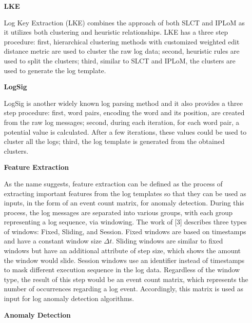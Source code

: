 \documentclass[12pt,a4paper]{article}
\begin{document}
	\vspace{0.3cm}
	\noindent \textbf{LKE}
	\vspace{0.2cm}
	
	\noindent Log Key Extraction (LKE) combines the approach of both SLCT and IPLoM as it utilizes both clustering and heuristic relationships. LKE has a three step procedure: first, hierarchical clustering methods with customized weighted edit distance metric are used to cluster the raw log data; second, heuristic rules are used to split the clusters; third, similar to SLCT and IPLoM, the clusters are used to generate the log template.
	 
	\vspace{0.3cm}
	\noindent \textbf{LogSig}
	\vspace{0.2cm}
	
	\noindent LogSig is another widely known log parsing method and it also provides a three step procedure: first, word pairs, encoding the word and its position, are created from the raw log messages; second, during each iteration, for each word pair, a potential value is calculated. After a few iterations, these values could be used to cluster all the logs; third, the log template is generated from the obtained clusters.
	
	\vspace{0.4cm}
	\noindent \textbf{\large Feature Extraction}
	\vspace{0.3cm}
	
	\noindent As the name suggests, feature extraction can be defined as the process of extracting important features from the log templates so that they can be used as inputs, in the form of an event count matrix, for anomaly detection. During this process, the log messages are separated into various groups, with each group representing a log sequence, via windowing. The work of [3] describes three types of windows: Fixed, Sliding, and Session. Fixed windows are  based on timestamps and have a constant window size $\Delta t$. Sliding windows are similar to fixed windows but have an additional attribute of step size, which shows the amount the window would slide. Session windows use an identifier instead of timestamps to mask different execution sequence in the log data. Regardless of the window type, the result of this step would be an event count matrix, which represents the number of occurrences regarding a log event. Accordingly, this matrix is used as input for log anomaly detection algorithms.
	
	\vspace{0.4cm}
	\noindent \textbf{\large Anomaly Detection}
	\vspace{0.3cm}
	
\end{document}
